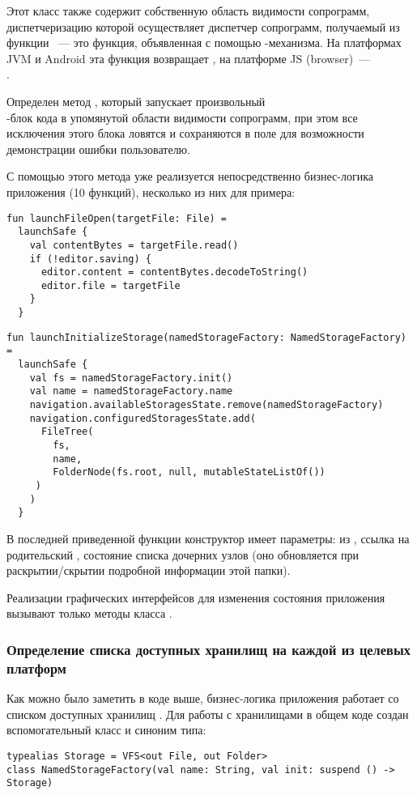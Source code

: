     Этот класс также содержит собственную область видимости сопрограмм, диспетчеризацию которой осуществляет диспетчер сопрограмм, получаемый из функции ~--- это функция, объявленная с помощью -механизма. На платформах JVM и Android эта функция возвращает , на платформе JS (browser)~---\\ . 

    Определен метод , который запускает произвольный\\ -блок кода в упомянутой области видимости сопрограмм, при этом все исключения этого блока ловятся и сохраняются в поле  для возможности демонстрации ошибки пользователю.

    С помощью этого метода уже реализуется непосредственно бизнес-логика приложения (10 функций), несколько из них для примера: 

    \begin{verbatim}
fun launchFileOpen(targetFile: File) =
  launchSafe {
    val contentBytes = targetFile.read()
    if (!editor.saving) {
      editor.content = contentBytes.decodeToString()
      editor.file = targetFile
    }
  }
    \end{verbatim}

    \begin{verbatim}
fun launchInitializeStorage(namedStorageFactory: NamedStorageFactory) =
  launchSafe {
    val fs = namedStorageFactory.init()
    val name = namedStorageFactory.name
    navigation.availableStoragesState.remove(namedStorageFactory)
    navigation.configuredStoragesState.add(
      FileTree(
        fs,
        name,
        FolderNode(fs.root, null, mutableStateListOf())
     )
    )
  }
    \end{verbatim}

    В последней приведенной функции конструктор  имеет параметры:  из , ссылка на родительский , состояние списка дочерних узлов (оно обновляется при раскрытии/скрытии подробной информации этой папки).

    Реализации графических интерфейсов для изменения состояния приложения вызывают только методы класса .

  \subsubsection{Определение списка доступных хранилищ на каждой из целевых платформ}
    Как можно было заметить в коде выше, бизнес-логика приложения работает со списком доступных хранилищ . Для работы с хранилищами  в общем коде создан вспомогательный класс и синоним типа:
    \begin{verbatim}
typealias Storage = VFS<out File, out Folder>
class NamedStorageFactory(val name: String, val init: suspend () -> Storage)
    \end{verbatim}


